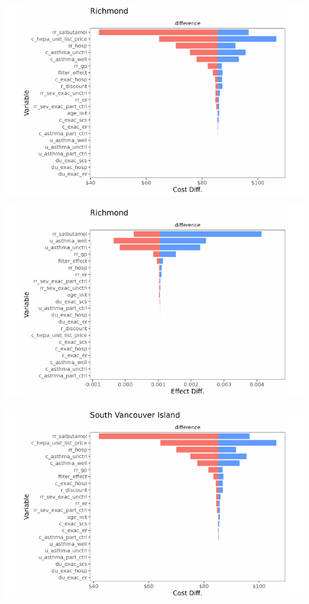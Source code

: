 \documentclass[
  number]{elsarticle}
\begin{document}
\includegraphics{index_files/figure-pdf/unnamed-chunk-9-25.pdf}

\includegraphics{index_files/figure-pdf/unnamed-chunk-9-26.pdf}

\includegraphics{index_files/figure-pdf/unnamed-chunk-9-27.pdf}
\end{document}
